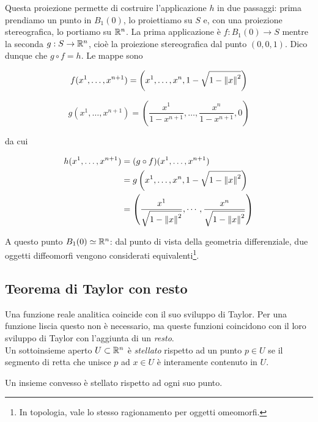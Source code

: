 Questa proiezione permette di costruire l'applicazione $ h $ in due passaggi: prima prendiamo un punto in $ B_{1}(0) $, lo proiettiamo su $ S $ e, con una proiezione stereografica, lo portiamo su $ \mathbb{R}^{n} $. La prima applicazione è $ f : B_{1}(0) \to S $ mentre la seconda $ g : S \to \mathbb{R}^{n} $, cioè la proiezione stereografica dal punto $ (0,0,1) $. Dico dunque che $ g \circ f = h $. Le mappe sono

\begin{equation}
	f (x^{1},\dots,x^{n+1}) = \left( x^{1},\dots,x^{n},1-\sqrt{1-\norm{x}^{2}} \right)
\end{equation}

\begin{equation}
	g (x^{1},\dots,x^{n+1}) = \left( \dfrac{x^{1}}{1-x^{n+1}},\dots,\dfrac{x^{n}}{1-x^{n+1}},0 \right)
\end{equation}

da cui

\begin{align}
	\begin{split}
		h (x^{1},\dots,x^{n+1}) &= (g \circ f) (x^{1},\dots,x^{n+1})\\
		&= g \left( x^{1},\dots,x^{n},1-\sqrt{1-\norm{x}^{2}} \right)\\
		&= \left( \dfrac{x^{1}}{\sqrt{1 - \norm{x}^{2}}}, \cdots, \dfrac{x^{n}}{\sqrt{1 - \norm{x}^{2}}} \right)
	\end{split}
\end{align}

A questo punto $ B_{1} (0) \simeq \mathbb{R}^{n} $: dal punto di vista della geometria differenziale, due oggetti diffeomorfi vengono considerati equivalenti\footnote{%
	In topologia, vale lo stesso ragionamento per oggetti omeomorfi.}.

\subsection{Teorema di Taylor con resto}

Una funzione reale analitica coincide con il suo sviluppo di Taylor. Per una funzione liscia questo non è necessario, ma queste funzioni coincidono con il loro sviluppo di Taylor con l'aggiunta di un \textit{resto}.\\
Un sottoinsieme aperto $ U \subset \mathbb{R}^{n} $ è \textit{stellato} rispetto ad un punto $ p \in U $ se il segmento di retta che unisce $ p $ ad $ x \in U $ è interamente contenuto in $ U $.

\begin{remark}
	Un insieme convesso è stellato rispetto ad ogni suo punto.
\end{remark}

